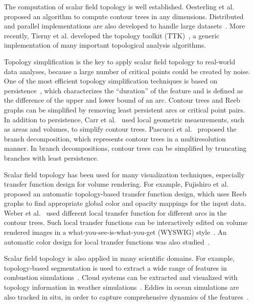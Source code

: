 The computation of scalar field topology is well established.  Oesterling et al.~\cite{OesterlingHWMS17} proposed an algorithm to compute contour trees in any dimensions.  Distributed and parallel implementations are also developed to handle large datasets~\cite{MorozovW13}.  More recently, Tierny et al. developed the topology toolkit (TTK)~\cite{TiernyFLGM18}, a generic implementation of many important topological analysis algorithms.  

Topology simplification is the key to apply scalar field topology to real-world data analyses, because a large number of critical points could be created by noise.  One of the most efficient topology simplification techniques is based on persistence~\cite{EdelsbrunnerLZ02}, which characterizes the ``duration'' of the feature and is defined as the difference of the upper and lower bound of an arc.  Contour trees and Reeb graphs can be simplified by removing least persistent arcs or critical point pairs.  
In addition to persistence, Carr et al.~\cite{CarrSP04} used local geometric measurements, such as areas and volumes, to simplify contour trees.  Pascucci et al.~\cite{Pascucci2004} proposed the branch decomposition, which represents contour trees in a multiresolution manner.  In branch decompositions, contour trees can be simplified by truncating branches with least persistence.  

Scalar field topology has been used for many visualization techniques, especially transfer function design for volume rendering.  For example, Fujishiro et al.~\cite{FujishiroAT99} proposed an automatic topology-based transfer function design, which uses Reeb graphs to find appropriate global color and opacity mappings for the input data.  Weber et al.~\cite{WeberDCPH07} used different local transfer function for different arcs in the contour trees.  Such local transfer functions can be interactively edited on volume rendered images in a what-you-see-is-what-you-get (WYSWIG) style~\cite{GuoY13}.  An automatic color design for local transfer functions was also studied~\cite{ZhouT09}.  

Scalar field topology is also applied in many scientific domains.  For example, topology-based segmentation is used to extract a wide range of features in combustion simulations~\cite{LandgePGBKCB14}.  Cloud systems can be extracted and visualized with topology information in weather simulations~\cite{DoraiswamyNN13}.  Eddies in ocean simulations are also tracked in situ, in order to capture comprehensive dynamics of the features~\cite{WoodringPSPAH16}.  %

